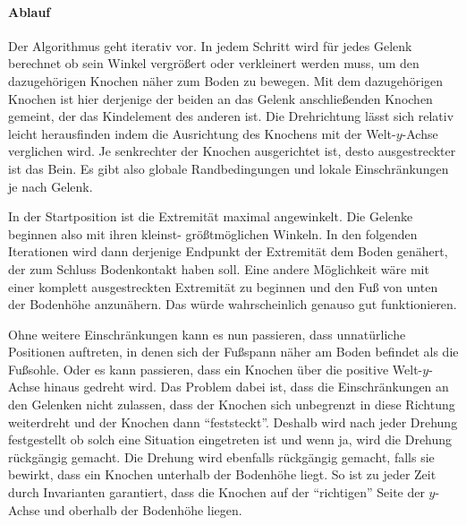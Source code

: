 \paragraph{Ablauf}
Der Algorithmus geht iterativ vor.
In jedem Schritt wird für jedes Gelenk berechnet ob sein Winkel vergrößert oder verkleinert werden muss, um den dazugehörigen Knochen näher zum Boden zu bewegen.
Mit dem dazugehörigen Knochen ist hier derjenige der beiden an das Gelenk anschließenden Knochen gemeint, der das Kindelement des anderen ist.
Die Drehrichtung lässt sich relativ leicht herausfinden indem die Ausrichtung des Knochens mit der Welt-$y$-Achse verglichen wird. Je senkrechter der Knochen ausgerichtet ist, desto ausgestreckter ist das Bein.
Es gibt also globale Randbedingungen und lokale Einschränkungen je nach Gelenk. %

In der Startposition ist die Extremität maximal angewinkelt. Die Gelenke beginnen also mit ihren kleinst- \bzw größtmöglichen Winkeln. In den folgenden Iterationen wird dann derjenige Endpunkt der Extremität dem Boden genähert, der zum Schluss Bodenkontakt haben soll. 
Eine andere Möglichkeit wäre mit einer komplett ausgestreckten Extremität zu beginnen und den Fuß von unten der Bodenhöhe anzunähern. Das würde wahrscheinlich genauso gut funktionieren.

Ohne weitere Einschränkungen kann es nun passieren, dass unnatürliche Positionen auftreten, in denen sich \zb der Fußspann näher am Boden befindet als die Fußsohle.
Oder es kann passieren, dass ein Knochen über die positive Welt-$y$-Achse hinaus gedreht wird. Das Problem dabei ist, dass die Einschränkungen an den Gelenken nicht zulassen, dass der Knochen sich unbegrenzt in diese Richtung weiterdreht und der Knochen dann "`feststeckt"'. Deshalb wird nach jeder Drehung festgestellt ob solch eine Situation eingetreten ist und wenn ja, wird die Drehung rückgängig gemacht.
Die Drehung wird ebenfalls rückgängig gemacht, falls sie bewirkt, dass ein Knochen unterhalb der Bodenhöhe liegt.
So ist zu jeder Zeit durch Invarianten garantiert, dass die Knochen auf der "`richtigen"' Seite der $y$-Achse und oberhalb der Bodenhöhe liegen.

